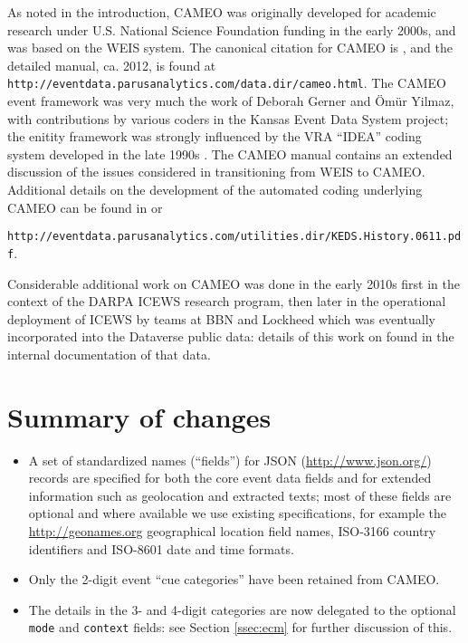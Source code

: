 \documentclass[11pt]{report}
\begin{document}
As noted in the introduction, CAMEO was originally developed for academic research under U.S. National Science Foundation funding in the early 2000s, and was based on the WEIS system. The canonical citation for CAMEO is \cite{SGY09}, and the detailed manual, ca. 2012, is found at \texttt{\footnotesize http://eventdata.parusanalytics.com/data.dir/cameo.html}.  The CAMEO event framework was very much the work of Deborah Gerner and \"Om\"ur Yilmaz, with contributions by various coders in the Kansas Event Data System project; the enitity framework was strongly influenced by the VRA ``IDEA'' coding system developed in the late 1990s \citep{BBOJT03}. The CAMEO manual contains an extended discussion of the issues considered in transitioning from WEIS to CAMEO. Additional details on the development of the automated coding underlying CAMEO can be found in \cite{Schrodt06TPM} or {\texttt{\footnotesize http://eventdata.parusanalytics.com/utilities.dir/KEDS.History.0611.pdf}.  

Considerable additional work on CAMEO was done in the early 2010s first in the context of the DARPA ICEWS research program, then later in the operational deployment of ICEWS by teams at BBN and Lockheed which was eventually incorporated into the Dataverse public data: details of this work on found in the internal documentation of that data.

\section{Summary of changes}

\begin{itemize}

\item A set of standardized names (``fields'') for JSON (\url{http://www.json.org/}) records are specified for both the core event data fields and for extended information such as geolocation and extracted texts; most of these fields are optional and where available we use existing specifications, for example the \url{http://geonames.org} geographical location field names, ISO-3166 country identifiers and ISO-8601 date and time formats.

\item Only the 2-digit event ``cue categories'' have been retained from CAMEO.

\item The details in the 3- and 4-digit categories are now delegated to the optional \texttt{mode} and \texttt{context} fields: see Section \ref{ssec:ecm} for further discussion of this.  


\end{itemize}}
\end{document}
